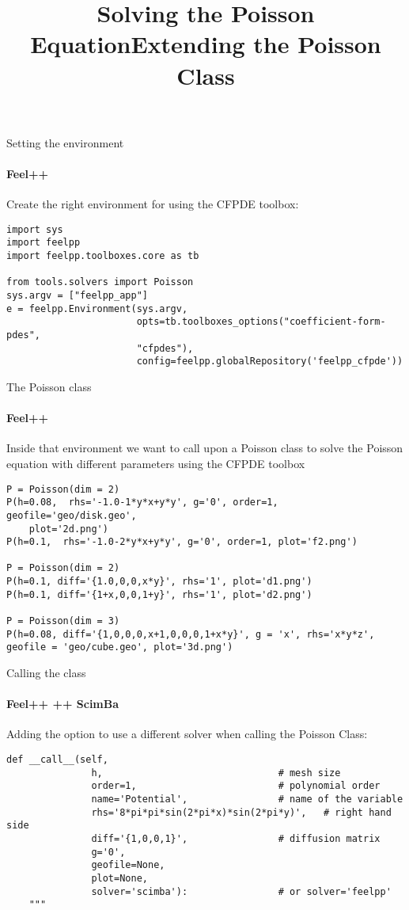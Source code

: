 \documentclass{beamer}
\begin{document}
\begin{frame}[fragile]{Setting the environment}
\framesubtitle{Feel++}

Create the right environment for using the CFPDE toolbox:

\begin{lstlisting}
import sys
import feelpp
import feelpp.toolboxes.core as tb

from tools.solvers import Poisson
sys.argv = ["feelpp_app"]
e = feelpp.Environment(sys.argv,
                       opts=tb.toolboxes_options("coefficient-form-pdes", 
                       "cfpdes"),
                       config=feelpp.globalRepository('feelpp_cfpde'))

\end{lstlisting}

\end{frame}


\begin{frame}[fragile]{The Poisson class}
\title{Solving the Poisson Equation}
\framesubtitle{Feel++}

Inside that environment we want to call upon a Poisson class to solve the Poisson equation with different parameters using the CFPDE toolbox
\begin{lstlisting}
P = Poisson(dim = 2)
P(h=0.08,  rhs='-1.0-1*y*x+y*y', g='0', order=1, geofile='geo/disk.geo',
    plot='2d.png')
P(h=0.1,  rhs='-1.0-2*y*x+y*y', g='0', order=1, plot='f2.png')

P = Poisson(dim = 2)
P(h=0.1, diff='{1.0,0,0,x*y}', rhs='1', plot='d1.png')
P(h=0.1, diff='{1+x,0,0,1+y}', rhs='1', plot='d2.png')

P = Poisson(dim = 3)
P(h=0.08, diff='{1,0,0,0,x+1,0,0,0,1+x*y}', g = 'x', rhs='x*y*z', 
geofile = 'geo/cube.geo', plot='3d.png') 

\end{lstlisting}

\end{frame}



\begin{frame}[fragile]{Calling the class}
\title{Extending the Poisson Class}
\framesubtitle{Feel++ ++ ScimBa}

Adding the option to use a different solver when calling the Poisson Class:
\begin{lstlisting}
def __call__(self,
               h,                               # mesh size 
               order=1,                         # polynomial order 
               name='Potential',                # name of the variable
               rhs='8*pi*pi*sin(2*pi*x)*sin(2*pi*y)',   # right hand side
               diff='{1,0,0,1}',                # diffusion matrix
               g='0',
               geofile=None,
               plot=None,
               solver='scimba'):                # or solver='feelpp'
    """
\end{lstlisting}

\end{frame}
\end{document}
